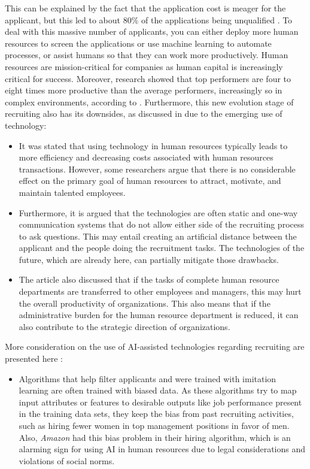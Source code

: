 \documentclass[draft,final]{thesisclass} %
\begin{document}
\begin{enumerate}
    This can be explained by the fact that the application cost is meager for the applicant, but this led to about 80\% of the applications being unqualified \parencite[4]{ai_recruiting}.
    To deal with this massive number of applicants, you can either deploy more human resources to screen the applications or use machine learning to automate processes, or assist humans so that they can work more productively.
    Human resources are mission-critical for companies as human capital is increasingly critical for success.
    Moreover, research showed that top performers are four to eight times more productive than the average performers, increasingly so in complex environments, according to \textcite[4]{ai_recruiting}.
    Furthermore, this new evolution stage of recruiting also has its downsides, as discussed in \textcite[4-5]{challenges_opportunities_hr} due to the emerging use of technology:
    \begin{itemize}
        \item It was stated that using technology in human resources typically leads to more efficiency and decreasing costs associated with human resources transactions. However, some researchers argue that there is no considerable effect on the primary goal of human resources to attract, motivate, and maintain talented employees. 
        \item Furthermore, it is argued that the technologies are often static and one-way communication systems that do not allow either side of the recruiting process to ask questions. This may entail creating an artificial distance between the applicant and the people doing the recruitment tasks. The technologies of the future, which are already here, can partially mitigate those drawbacks.
        \item The article also discussed that if the tasks of complete human resource departments are transferred to other employees and managers, this may hurt the overall productivity of organizations. This also means that if the administrative burden for the human resource department is reduced, it can also contribute to the strategic direction of organizations.
    \end{itemize}
    More consideration on the use of \acs{AI}-assisted technologies regarding recruiting are presented here \parencite[2-4]{ai_in_hr_management}:
    \begin{itemize}
        \item Algorithms that help filter applicants and were trained with imitation learning are often trained with biased data. As these algorithms try to map input attributes or features to desirable outputs like job performance present in the training data sets, they keep the bias from past recruiting activities, such as hiring fewer women in top management positions in favor of men. Also, \textit{Amazon} had this bias problem in their hiring algorithm, which is an alarming sign for using \acs{AI} in human resources due to legal considerations and violations of social norms.

\end{itemize}
\end{enumerate}
\end{document}
